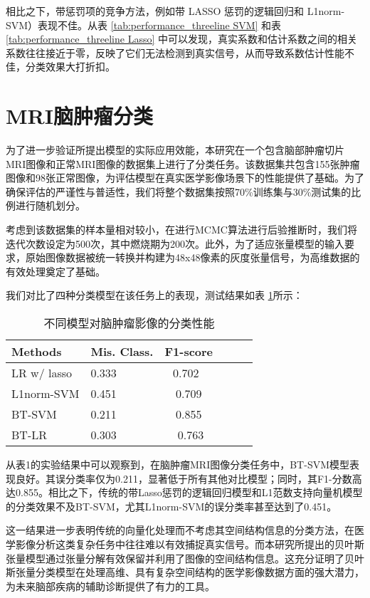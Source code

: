 \documentclass[AutoFakeBold]{LZUThesis}
\begin{document}
相比之下，带惩罚项的竞争方法，例如带 LASSO 惩罚的逻辑回归和 L1norm-SVM）表现不佳。从表 \ref{tab:performance_threeline SVM} 和表 \ref{tab:performance_threeline Lasso} 中可以发现，真实系数和估计系数之间的相关系数往往接近于零，反映了它们无法检测到真实信号，从而导致系数估计性能不佳，分类效果大打折扣。

\section{MRI脑肿瘤分类}
为了进一步验证所提出模型的实际应用效能，本研究在一个包含脑部肿瘤切片MRI图像和正常MRI图像的数据集上进行了分类任务。该数据集共包含155张肿瘤图像和98张正常图像，为评估模型在真实医学影像场景下的性能提供了基础。为了确保评估的严谨性与普适性，我们将整个数据集按照70\%训练集与30\%测试集的比例进行随机划分。

考虑到该数据集的样本量相对较小，在进行MCMC算法进行后验推断时，我们将迭代次数设定为500次，其中燃烧期为200次。此外，为了适应张量模型的输入要求，原始图像数据被统一转换并构建为48x48像素的灰度张量信号，为高维数据的有效处理奠定了基础。

我们对比了四种分类模型在该任务上的表现，测试结果如表 \ref{tab:performance_threeline MRI}所示：

\begin{table}[h]
\centering
\caption{不同模型对脑肿瘤影像的分类性能}
\label{tab:performance_threeline MRI}
\begin{tabular}{llcccc}
\toprule
\textbf{Methods} & \textbf{Mis. Class.} & \textbf{F1-score} \\
\midrule
LR w/ lasso & 0.333 & 0.702  \\
L1norm-SVM & 0.451 & 0.709 \\
BT-SVM & 0.211 & 0.855 \\
BT-LR & 0.303 &  0.763  \\
\bottomrule
\end{tabular}
\end{table}

从表1的实验结果中可以观察到，在脑肿瘤MRI图像分类任务中，BT-SVM模型表现良好。其误分类率仅为0.211，显著低于所有其他对比模型；同时，其F1-分数高达0.855。相比之下，传统的带Lasso惩罚的逻辑回归模型和L1范数支持向量机模型的分类效果不及BT-SVM，尤其L1norm-SVM的误分类率甚至达到了0.451。

这一结果进一步表明传统的向量化处理而不考虑其空间结构信息的分类方法，在医学影像分析这类复杂任务中往往难以有效捕捉真实信号。而本研究所提出的贝叶斯张量模型通过张量分解有效保留并利用了图像的空间结构信息。这充分证明了贝叶斯张量分类模型在处理高维、具有复杂空间结构的医学影像数据方面的强大潜力，为未来脑部疾病的辅助诊断提供了有力的工具。
\backmatter
\end{document}
